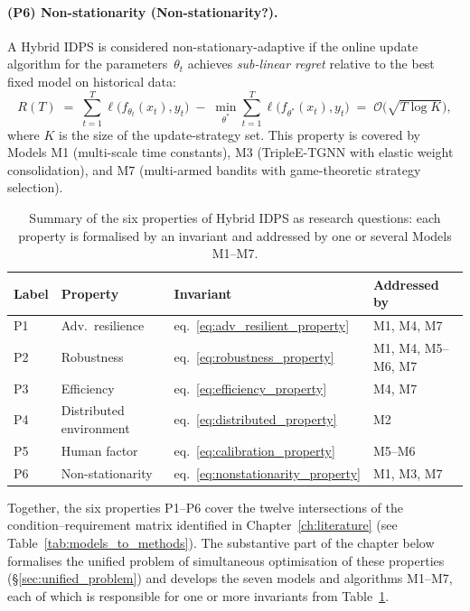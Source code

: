 \paragraph{(P6) Non-stationarity (Non-stationarity?).}
A Hybrid IDPS is considered non-stationary-adaptive if the online
update algorithm for the parameters~$\theta_t$ achieves
\emph{sub-linear regret} relative to the best fixed model on
historical data:
\begin{equation}
R(T) \;=\; \sum_{t=1}^{T} \ell\bigl(f_{\theta_t}(x_t), y_t\bigr)
\;-\;\min_{\theta^{*}} \sum_{t=1}^{T} \ell\bigl(f_{\theta^{*}}(x_t),
y_t\bigr) \;=\; \mathcal{O}\bigl(\sqrt{T\log K}\bigr),
\label{eq:nonstationarity_property}
\end{equation}
where $K$ is the size of the update-strategy set. This property is
covered by Models M1 (multi-scale time constants), M3
(\textsf{TripleE-TGNN} with elastic weight consolidation), and M7
(multi-armed bandits with game-theoretic strategy selection).

\begin{table}[H]
\centering
\caption{Summary of the six properties of Hybrid IDPS as research
questions: each property is formalised by an invariant and addressed
by one or several Models M1--M7.}
\label{tab:six_properties}
\small
\setlength{\tabcolsep}{4pt}
\renewcommand{\arraystretch}{0.92}\begin{tabular}{l p{2.6cm} p{5.5cm} p{3.5cm}}
\toprule
\textbf{Label} & \textbf{Property} & \textbf{Invariant} & \textbf{Addressed by} \\
\midrule
P1 & Adv.\ resilience            & eq.~\eqref{eq:adv_resilient_property}      & M1, M4, M7 \\
P2 & Robustness                  & eq.~\eqref{eq:robustness_property}        & M1, M4, M5--M6, M7 \\
P3 & Efficiency                  & eq.~\eqref{eq:efficiency_property}        & M4, M7 \\
P4 & Distributed environment     & eq.~\eqref{eq:distributed_property}       & M2 \\
P5 & Human factor                & eq.~\eqref{eq:calibration_property}       & M5--M6 \\
P6 & Non-stationarity            & eq.~\eqref{eq:nonstationarity_property}   & M1, M3, M7 \\
\bottomrule
\end{tabular}
\end{table}

Together, the six properties P1--P6 cover the twelve intersections
of the condition--requirement matrix identified in
Chapter~\ref{ch:literature} (see Table~\ref{tab:models_to_methods}).
The substantive part of the chapter below formalises the unified
problem of simultaneous optimisation of these properties
(\S\ref{sec:unified_problem}) and develops the seven models and
algorithms M1--M7, each of which is responsible for one or more
invariants from Table~\ref{tab:six_properties}.


